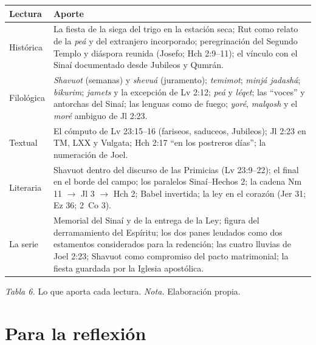 \documentclass[11pt,letterpaper]{article}
\begin{document}
\begin{center}\small\renewcommand{\arraystretch}{1.22}
\begin{tabular}{@{}L{3.0cm}L{12.4cm}@{}}
\toprule
\textbf{Lectura} & \textbf{Aporte} \\ \midrule
Histórica & La fiesta de la siega del trigo en la estación seca; Rut como relato de la \emph{peá} y del extranjero incorporado; peregrinación del Segundo Templo y diáspora reunida (Josefo; Hch 2:9--11); el vínculo con el Sinaí documentado desde Jubileos y Qumrán. \\
Filológica & \emph{Shavuot} (semanas) y \emph{shevuá} (juramento); \emph{temimot}; \emph{minjá jadashá}; \emph{bikurim}; \emph{jamets} y la excepción de Lv 2:12; \emph{peá} y \emph{léqet}; las ``voces'' y antorchas del Sinaí; las lenguas como de fuego; \emph{yoré}, \emph{malqosh} y el \emph{moré} ambiguo de Jl 2:23. \\
Textual & El cómputo de Lv 23:15--16 (fariseos, saduceos, Jubileos); Jl 2:23 en TM, LXX y Vulgata; Hch 2:17 ``en los postreros días''; la numeración de Joel. \\
Literaria & Shavuot dentro del discurso de las Primicias (Lv 23:9--22); el final en el borde del campo; los paralelos Sinaí--Hechos 2; la cadena Nm 11 $\rightarrow$ Jl 3 $\rightarrow$ Hch 2; Babel invertida; la ley en el corazón (Jer 31; Ez 36; 2~Co 3). \\
La serie & Memorial del Sinaí y de la entrega de la Ley; figura del derramamiento del Espíritu; los dos panes leudados como dos estamentos considerados para la redención; las cuatro lluvias de Joel 2:23; Shavuot como compromiso del pacto matrimonial; la fiesta guardada por la Iglesia apostólica. \\
\bottomrule
\end{tabular}\par
{\footnotesize\color{sepia}\textit{Tabla 6.} Lo que aporta cada lectura. \textit{Nota.} Elaboración propia.}
\end{center}

\section{Para la reflexión}
\end{document}
